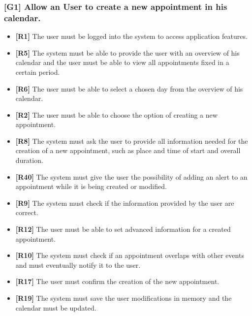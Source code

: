 \subsubsection{[G1] Allow an User to create a new appointment in his calendar.}
\begin{itemize}
	\item \textbf{[R1]} The user must be logged into the system to access application features.
	\item \textbf{[R5]} The system must be able to provide the user with an overview of his calendar and the user must be able to view all appointments fixed in a certain period.
	\item \textbf{[R6]} The user must be able to select a chosen day from the overview of his calendar.
	\item \textbf{[R2]} The user must be able to choose the option of creating a new appointment.
	\item \textbf{[R8]} The system must ask the user to provide all information needed for the creation of a new appointment, such as place and time of start and overall duration.
	\item \textbf{[R40]} The system must give the user the possibility of adding an alert to an appointment while it is being created or modified.
	\item \textbf{[R9]} The system must check if the information provided by the user are correct.
	\item \textbf{[R12]} The user must be able to set advanced information for a created appointment.
	\item \textbf{[R10]} The system must check if an appointment overlaps with other events and must eventually notify it to the user.
	\item \textbf{[R17]} The user must confirm the creation of the new appointment.
	\item \textbf{[R19]} The system must save the user modifications in memory and the calendar must be updated.
\end{itemize}

